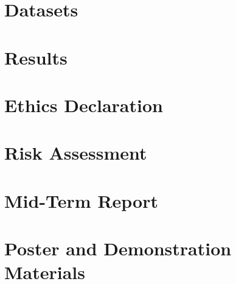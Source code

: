 \documentclass[twocolumn,twoside]{article}
\begin{document}
\appendix

\section{Datasets}\label{app:datasets}

\section{Results}\label{app:results}

\section{Ethics Declaration}\label{ethics-declaration}

\section{Risk Assessment}\label{risk-assessment}

\section{Mid-Term Report}\label{mid-term-report}

\section{Poster and Demonstration
Materials}\label{poster-and-demonstration-materials}


\end{document}

